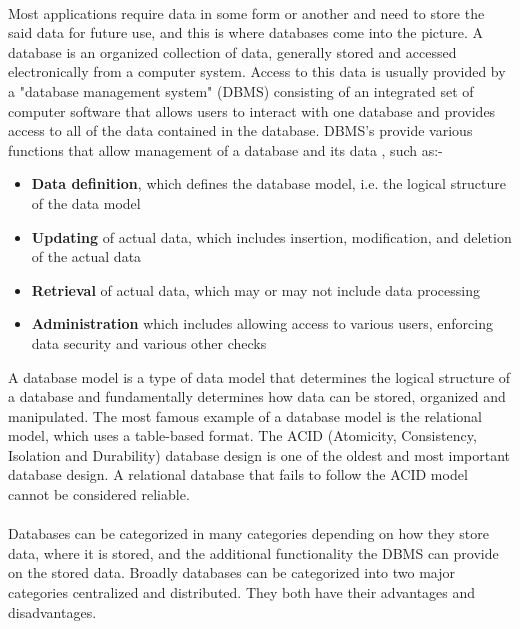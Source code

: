 \documentclass[12pt]{article}
\begin{document}
        \paragraph{}
        Most applications require data in some form or another and need to store the said data for future use, and this is where databases come into the picture.
        A database is an organized collection of data, generally stored and accessed electronically from a computer system.
        Access to this data is usually provided by a "database management system" (DBMS) consisting of an integrated set of computer software that allows users to interact with one database and provides access to all of the data contained in the database.
        DBMS's provide various functions that allow management of a database and its data \cite{wikidbms}, such as:-
        \begin{itemize}
            \item \textbf{Data definition}, which defines the database model, i.e. the logical structure of the data model
            \item \textbf{Updating} of actual data, which includes insertion, modification, and deletion of the actual data
            \item \textbf{Retrieval} of actual data, which may or may not include data processing
            \item \textbf{Administration} which includes allowing access to various users, enforcing data security and various other checks
        \end{itemize}
        A database model is a type of data model that determines the logical structure of a database and fundamentally determines how data can be stored, organized and manipulated. The most famous example of a database model is the relational model, which uses a table-based format. The ACID (Atomicity, Consistency, Isolation and Durability) database design is one of the oldest and most important database design. A relational database that fails to follow the ACID model cannot be considered reliable. 
        \paragraph{}
        Databases can be categorized in many categories depending on how they store data, where it is stored, and the additional functionality the DBMS can provide on the stored data. Broadly databases can be categorized into two major categories centralized and distributed. They both have their advantages and disadvantages.
\end{document}
